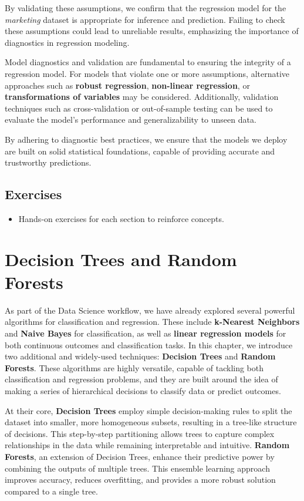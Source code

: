 \documentclass[
]{book}
\providecommand{\tightlist}{%
  \setlength{\itemsep}{0pt}\setlength{\parskip}{0pt}}
\theoremstyle{definition}
\theoremstyle{definition}
\theoremstyle{definition}
\theoremstyle{definition}
\theoremstyle{remark}
\begin{document}
By validating these assumptions, we confirm that the regression model for the \emph{marketing} dataset is appropriate for inference and prediction. Failing to check these assumptions could lead to unreliable results, emphasizing the importance of diagnostics in regression modeling.

Model diagnostics and validation are fundamental to ensuring the integrity of a regression model. For models that violate one or more assumptions, alternative approaches such as \textbf{robust regression}, \textbf{non-linear regression}, or \textbf{transformations of variables} may be considered. Additionally, validation techniques such as cross-validation or out-of-sample testing can be used to evaluate the model's performance and generalizability to unseen data.

By adhering to diagnostic best practices, we ensure that the models we deploy are built on solid statistical foundations, capable of providing accurate and trustworthy predictions.

\section{\texorpdfstring{\textbf{Exercises}}{Exercises}}\label{exercises-5}

\begin{itemize}
\tightlist
\item
  Hands-on exercises for each section to reinforce concepts.
\end{itemize}

\chapter{Decision Trees and Random Forests}\label{chapter-tree}

As part of the Data Science workflow, we have already explored several powerful algorithms for classification and regression. These include \textbf{k-Nearest Neighbors} and \textbf{Naive Bayes} for classification, as well as \textbf{linear regression models} for both continuous outcomes and classification tasks. In this chapter, we introduce two additional and widely-used techniques: \textbf{Decision Trees} and \textbf{Random Forests}. These algorithms are highly versatile, capable of tackling both classification and regression problems, and they are built around the idea of making a series of hierarchical decisions to classify data or predict outcomes.

At their core, \textbf{Decision Trees} employ simple decision-making rules to split the dataset into smaller, more homogeneous subsets, resulting in a tree-like structure of decisions. This step-by-step partitioning allows trees to capture complex relationships in the data while remaining interpretable and intuitive. \textbf{Random Forests}, an extension of Decision Trees, enhance their predictive power by combining the outputs of multiple trees. This ensemble learning approach improves accuracy, reduces overfitting, and provides a more robust solution compared to a single tree.
\end{document}

